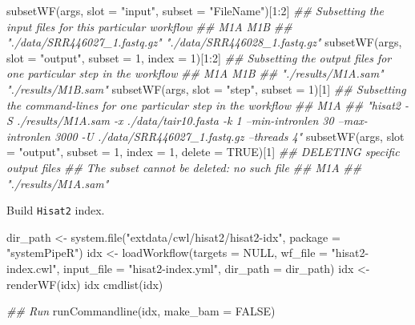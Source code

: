 \documentclass[14pt,]{article}
\newcommand{\hlnum}[1]{\textcolor[rgb]{0.816,0.125,0.439}{#1}}%
\newcommand{\hlstr}[1]{\textcolor[rgb]{0.251,0.627,0.251}{#1}}%
\newcommand{\hlcom}[1]{\textcolor[rgb]{0.502,0.502,0.502}{\textit{#1}}}%
\newcommand{\hlopt}[1]{\textcolor[rgb]{0,0,0}{#1}}%
\newcommand{\hlstd}[1]{\textcolor[rgb]{0.251,0.251,0.251}{#1}}%
\newcommand{\hlkwc}[1]{\textcolor[rgb]{0.251,0.251,0.251}{#1}}%
\newcommand{\hlkwd}[1]{\textcolor[rgb]{0.878,0.439,0.125}{#1}}%
\newenvironment{Shaded}{\begin{myshaded}}{\end{myshaded}}
\newcommand{\KeywordTok}[1]{\hlkwd{#1}}
\newcommand{\DataTypeTok}[1]{\hlkwc{#1}}
\newcommand{\DecValTok}[1]{\hlnum{#1}}
\newcommand{\StringTok}[1]{\hlstr{#1}}
\newcommand{\CommentTok}[1]{\hlcom{#1}}
\newcommand{\OtherTok}[1]{{#1}}
\newcommand{\OperatorTok}[1]{\hlopt{#1}}
\newcommand{\NormalTok}[1]{\hlstd{#1}}
\begin{document}
\begin{Shaded}
\begin{Highlighting}[]
\KeywordTok{subsetWF}\NormalTok{(args, }\DataTypeTok{slot =} \StringTok{"input"}\NormalTok{, }\DataTypeTok{subset =} \StringTok{"FileName"}\NormalTok{)[}\DecValTok{1}\OperatorTok{:}\DecValTok{2}\NormalTok{]  }\CommentTok{## Subsetting the input files for this particular workflow }
\CommentTok{##                           M1A                           M1B }
\CommentTok{## "./data/SRR446027_1.fastq.gz" "./data/SRR446028_1.fastq.gz"}
\KeywordTok{subsetWF}\NormalTok{(args, }\DataTypeTok{slot =} \StringTok{"output"}\NormalTok{, }\DataTypeTok{subset =} \DecValTok{1}\NormalTok{, }\DataTypeTok{index =} \DecValTok{1}\NormalTok{)[}\DecValTok{1}\OperatorTok{:}\DecValTok{2}\NormalTok{]  }\CommentTok{## Subsetting the output files for one particular step in the workflow }
\CommentTok{##                 M1A                 M1B }
\CommentTok{## "./results/M1A.sam" "./results/M1B.sam"}
\KeywordTok{subsetWF}\NormalTok{(args, }\DataTypeTok{slot =} \StringTok{"step"}\NormalTok{, }\DataTypeTok{subset =} \DecValTok{1}\NormalTok{)[}\DecValTok{1}\NormalTok{]  }\CommentTok{## Subsetting the command-lines for one particular step in the workflow }
\CommentTok{##                                                                                                                                               M1A }
\CommentTok{## "hisat2 -S ./results/M1A.sam  -x ./data/tair10.fasta  -k 1  --min-intronlen 30  --max-intronlen 3000  -U ./data/SRR446027_1.fastq.gz --threads 4"}
\KeywordTok{subsetWF}\NormalTok{(args, }\DataTypeTok{slot =} \StringTok{"output"}\NormalTok{, }\DataTypeTok{subset =} \DecValTok{1}\NormalTok{, }\DataTypeTok{index =} \DecValTok{1}\NormalTok{, }\DataTypeTok{delete =} \OtherTok{TRUE}\NormalTok{)[}\DecValTok{1}\NormalTok{]  }\CommentTok{## DELETING specific output files}
\CommentTok{## The subset cannot be deleted: no such file}
\CommentTok{##                 M1A }
\CommentTok{## "./results/M1A.sam"}
\end{Highlighting}
\end{Shaded}

Build \texttt{Hisat2} index.

\begin{Shaded}
\begin{Highlighting}[]
\NormalTok{dir_path <-}\StringTok{ }\KeywordTok{system.file}\NormalTok{(}\StringTok{"extdata/cwl/hisat2/hisat2-idx"}\NormalTok{, }\DataTypeTok{package =} \StringTok{"systemPipeR"}\NormalTok{)}
\NormalTok{idx <-}\StringTok{ }\KeywordTok{loadWorkflow}\NormalTok{(}\DataTypeTok{targets =} \OtherTok{NULL}\NormalTok{, }\DataTypeTok{wf_file =} \StringTok{"hisat2-index.cwl"}\NormalTok{, }\DataTypeTok{input_file =} \StringTok{"hisat2-index.yml"}\NormalTok{, }
    \DataTypeTok{dir_path =}\NormalTok{ dir_path)}
\NormalTok{idx <-}\StringTok{ }\KeywordTok{renderWF}\NormalTok{(idx)}
\NormalTok{idx}
\KeywordTok{cmdlist}\NormalTok{(idx)}

\CommentTok{## Run}
\KeywordTok{runCommandline}\NormalTok{(idx, }\DataTypeTok{make_bam =} \OtherTok{FALSE}\NormalTok{)}
\end{Highlighting}
\end{Shaded}
\end{document}
